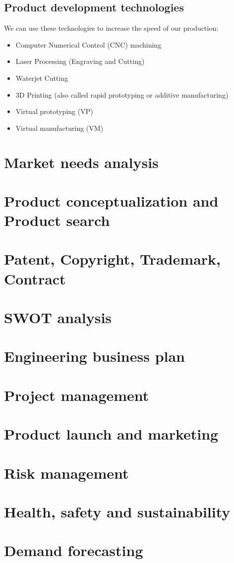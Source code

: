 \documentclass{article}
\begin{document}
\subsection{Product development technologies}
We can use these technologies to increase the speed of our production:
\begin{itemize}
      \item Computer Numerical Control (CNC) machining
      \item Laser Processing (Engraving and Cutting)
      \item Waterjet Cutting
      \item 3D Printing (also called rapid prototyping or additive manufacturing)
      \item Virtual prototyping (VP)
      \item Virtual manufacturing (VM)
\end{itemize}


\section{Market needs analysis}
\label{sec:market}
\section{Product conceptualization and Product search}
\section{Patent, Copyright, Trademark, Contract}
\section{SWOT analysis}
\section{Engineering business plan}
\section{Project management}
\section{Product launch and marketing}
\section{Risk management}
\section{Health, safety and sustainability}
\section{Demand forecasting}
\end{document}
